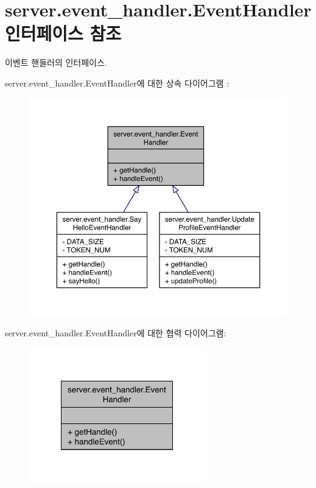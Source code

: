 \hypertarget{interfaceserver_1_1event__handler_1_1_event_handler}{\section{server.\-event\-\_\-handler.\-Event\-Handler 인터페이스 참조}
\label{interfaceserver_1_1event__handler_1_1_event_handler}
}


이벤트 핸들러의 인터페이스.  




server.\-event\-\_\-handler.\-Event\-Handler에 대한 상속 다이어그램 \-: \nopagebreak
\begin{figure}[H]
\begin{center}
\leavevmode
\includegraphics[width=350pt]{interfaceserver_1_1event__handler_1_1_event_handler__inherit__graph}
\end{center}
\end{figure}


server.\-event\-\_\-handler.\-Event\-Handler에 대한 협력 다이어그램\-:\nopagebreak
\begin{figure}[H]
\begin{center}
\leavevmode
\includegraphics[width=216pt]{interfaceserver_1_1event__handler_1_1_event_handler__coll__graph}
\end{center}
\end{figure}
